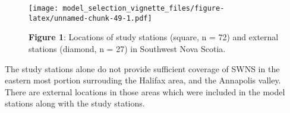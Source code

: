 \documentclass[]{article}
\newenvironment{Shaded}{\begin{snugshade}}{\end{snugshade}}
\newcommand{\KeywordTok}[1]{\textcolor[rgb]{0.13,0.29,0.53}{\textbf{#1}}}
\newcommand{\DataTypeTok}[1]{\textcolor[rgb]{0.13,0.29,0.53}{#1}}
\newcommand{\DecValTok}[1]{\textcolor[rgb]{0.00,0.00,0.81}{#1}}
\newcommand{\StringTok}[1]{\textcolor[rgb]{0.31,0.60,0.02}{#1}}
\newcommand{\OperatorTok}[1]{\textcolor[rgb]{0.81,0.36,0.00}{\textbf{#1}}}
\newcommand{\ErrorTok}[1]{\textcolor[rgb]{0.64,0.00,0.00}{\textbf{#1}}}
\newcommand{\NormalTok}[1]{#1}
\begin{document}
\begin{Shaded}
\end{Shaded}

\begin{figure}
\centering
\texttt{[image: model\_selection\_vignette\_files/figure-latex/unnamed-chunk-49-1.pdf]}
\caption{\textbf{Figure 1}: Locations of study stations (square, n = 72)
and external stations (diamond, n = 27) in Southwest Nova Scotia.}
\end{figure}

The study stations alone do not provide sufficient coverage of SWNS in
the eastern most portion surrouding the Halifax area, and the Annapolis
valley. There are external locations in those areas which were included
in the model stations along with the study stations.
\end{document}
